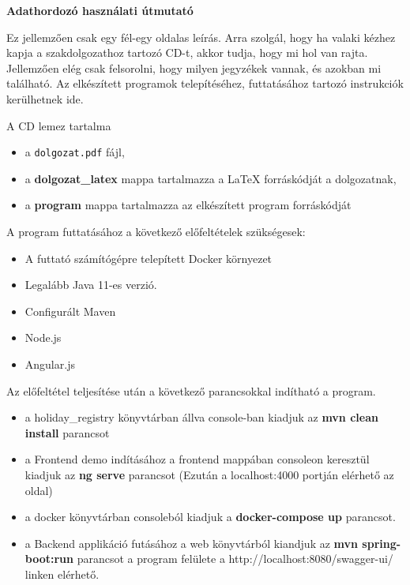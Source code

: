 \pagestyle{empty}

\noindent \textbf{\Large Adathordozó használati útmutató}

\vskip 1cm

Ez jellemzően csak egy fél-egy oldalas leírás.
Arra szolgál, hogy ha valaki kézhez kapja a szakdolgozathoz tartozó CD-t, akkor tudja, hogy mi hol van rajta.
Jellemzően elég csak felsorolni, hogy milyen jegyzékek vannak, és azokban mi található.
Az elkészített programok telepítéséhez, futtatásához tartozó instrukciók kerülhetnek ide.

A CD lemez tartalma
\begin{itemize}
\item a \texttt{dolgozat.pdf} fájl,
\item a \textbf{dolgozat\_latex} mappa tartalmazza a LaTeX forráskódját a dolgozatnak,
\item a \textbf{program} mappa tartalmazza az elkészített program forráskódját
\end{itemize}

\vskip 1cm

A program futtatásához a következő előfeltételek szükségesek:
\begin{itemize}
	\item A futtató számítógépre telepített Docker környezet
	\item Legalább Java 11-es verzió.
	\item Configurált Maven
	\item Node.js
	\item Angular.js
\end{itemize}

Az előfeltétel teljesítése után a következő parancsokkal indítható a program.

\begin{itemize}
	\item a holiday\_registry könyvtárban állva console-ban kiadjuk az \textbf{mvn clean install} parancsot
	\item a Frontend demo indításához a frontend mappában consoleon keresztül kiadjuk az \textbf{ng serve} parancsot (Ezután a localhost:4000 portján elérhető az oldal)
	\item a docker könyvtárban consoleból kiadjuk a \textbf{docker-compose up} parancsot.
	\item a Backend applikáció futásához a web könyvtárból kiandjuk az \textbf{mvn spring-boot:run} parancsot a program felülete a http://localhost:8080/swagger-ui/ linken elérhető.
\end{itemize}